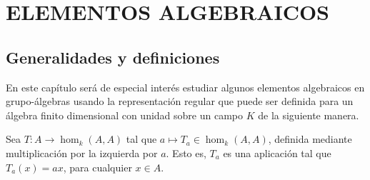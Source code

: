 \chapter{\hspace{1cm} ELEMENTOS ALGEBRAICOS}

\section{\quad Generalidades y definiciones}
En este capítulo será de especial interés estudiar algunos elementos algebraicos en grupo-álgebras usando la representación regular que puede ser definida para un álgebra finito dimensional con unidad sobre un campo $K$ de la siguiente manera.

\begin{definicion}
Sea $T \colon A \to \hom_k(A,A)$ tal que $a \mapsto T_a \in \hom_k(A,A)$, definida mediante multiplicación por la izquierda por $a$. Esto es, $T_a$ es una aplicación tal que $T_a(x) = ax$, para cualquier $x \in A$.  
\end{definicion}

